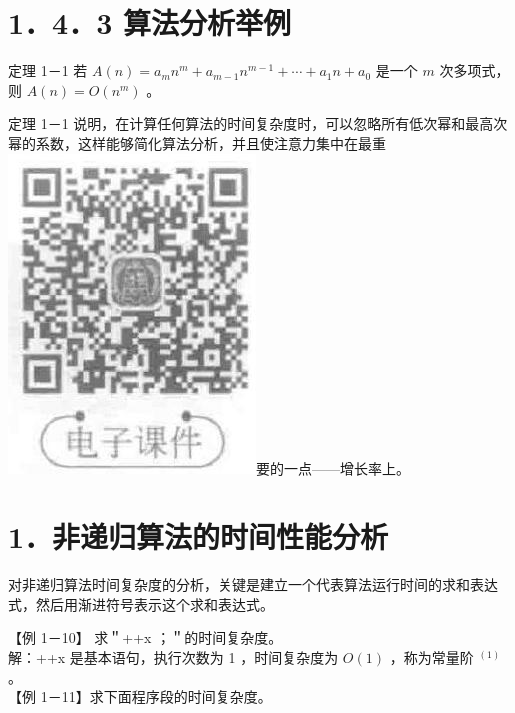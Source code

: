 \documentclass[10pt]{article}
\begin{document}
\section*{1．4．3 算法分析举例}
定理 1－1 若 $A(n)=a_{m} n^{m}+a_{m-1} n^{m-1}+\cdots+a_{1} n+a_{0}$ 是一个 $m$ 次多项式，则 $A(n)=O\left(n^{m}\right)$ 。

定理 1－1 说明，在计算任何算法的时间复杂度时，可以忽略所有低次幂和最高次幂的系数，这样能够简化算法分析，并且使注意力集中在最重\\
\includegraphics[max width=\textwidth]{2025_06_06_704745ea57b15b2333e5g-031(1)}要的一点——增长率上。

\section*{1．非递归算法的时间性能分析}
对非递归算法时间复杂度的分析，关键是建立一个代表算法运行时间的求和表达式，然后用渐进符号表示这个求和表达式。

【例 1－10】 求＂++x ；＂的时间复杂度。\\
解：++x 是基本语句，执行次数为 1 ，时间复杂度为 $O(1)$ ，称为常量阶 ${ }^{(1)}$ 。\\
【例 1－11】求下面程序段的时间复杂度。
\end{document}
